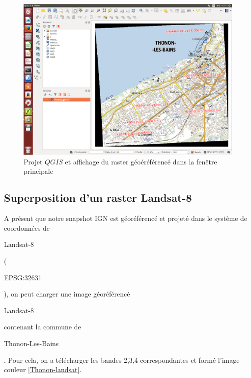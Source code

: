 \documentclass{book}
\begin{document}
\begin{figure}[H]
\begin{center}
\includegraphics[scale=0.3]{images/qgis-resultat.png}
\end{center}
\caption{Projet $QGIS$ et affichage du raster géoéréférencé dans la fen\^{e}tre principale}
\label{qgis-resultat}
\end{figure}

\clearpage

\subsection{Superposition d'un raster Landsat-8}

A présent que notre snapshot IGN est géoréférencé et projeté dans le système de coordonnées de \begin{itshape}Landsat-8\end{itshape}
(\begin{itshape}EPSG:32631\end{itshape}), on peut charger une image géoréférencé \begin{itshape}Landsat-8\end{itshape} contenant la 
commune de \begin{itshape}Thonon-Les-Bains\end{itshape}. Pour cela, on a télécharger les bandes 2,3,4 correspondantes et formé l'image 
couleur  \ref{Thonon-landsat}.
\end{document}
